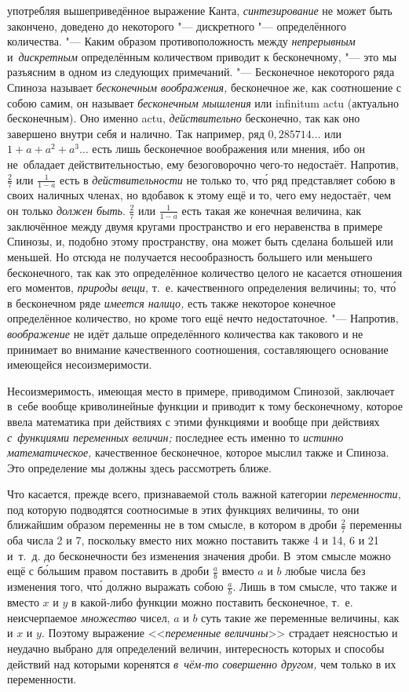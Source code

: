 употребляя вышеприведённое выражение Канта, {\em синтезирование} не может быть
закончено, доведено до некоторого "--- дискретного "--- определённого
количества. "--- Каким образом противоположность между {\em непрерывным}
и~{\em дискретным} определённым количеством приводит к бесконечному, "--- это
мы разъясним в одном из следующих примечаний. "--- Бесконечное некоторого ряда
Спиноза называет {\em бесконечным воображения,} бесконечное же, как соотношение
с собою самим, он называет {\em бесконечным мышления} или infinitum actu
(актуально бесконечным). Оно именно actu, {\em действительно} бесконечно, так
как оно завершено внутри себя и налично. Так например, ряд $0{,}285714\ldots$
или $1+a+a^2+a^3\ldots$ есть лишь бесконечное воображения или мнения, ибо он
не~обладает действительностью, ему безоговорочно чего-то недостаёт. Напротив,
$\frac 2 7$ или $\frac 1{1-a}$ есть в {\em действительности} не только то, чт\'{о} ряд
представляет собою в своих наличных членах, но вдобавок к этому ещё и то, чего
ему недостаёт, чем он только {\em должен быть}. $\frac 2 7$ или $\frac 1{1-a}$
есть такая же конечная величина, как заключённое между двумя кругами
пространство и его неравенства в примере Спинозы, и, подобно этому
пространству, она может быть сделана большей или меньшей. Но отсюда не
получается несообразность большего или меньшего бесконечного, так как это
определённое количество целого не касается отношения его моментов,
{\em природы вещи,} т.~е. качественного определения величины; то, чт\'{о} в бесконечном
ряде {\em имеется налицо,} есть также некоторое конечное определённое количество,
но кроме того ещё нечто недостаточное. "--- Напротив, {\em воображение} не идёт
дальше определённого количества как такового и не принимает во внимание
качественного соотношения, составляющего основание имеющейся несоизмеримости.

Несоизмеримость, имеющая место в примере, приводимом Спинозой, заключает в~себе
вообще криволинейные функции и приводит к тому бесконечному, которое ввела
математика при действиях с этими функциями и вообще при действиях
{\em с~функциями переменных величин;} последнее есть именно то
{\em истинно математическое,} качественное бесконечное, которое мыслил
также и Спиноза. Это определение мы должны здесь рассмотреть ближе.

Что касается, прежде всего, признаваемой столь важной категории
{\em переменности,} под которую подводятся соотносимые в этих функциях
величины, то они ближайшим образом переменны не в том смысле, в котором в дроби
$\frac 2 7$ переменны оба числа 2 и 7, поскольку вместо них можно поставить
также 4 и 14, 6 и 21 и~т.~д. до бесконечности без изменения значения дроби.
В~этом смысле можно ещё с б\'{о}льшим правом поставить в дроби $\frac a b$ вместо
$a$ и $b$ любые числа без изменения того, чт\'{о} должно выражать собою
$\frac a b$. Лишь в том смысле, что также и вместо $x$ и $y$ в какой-либо
функции можно поставить бесконечное, т.~е. неисчерпаемое {\em множество} чисел,
$a$ и $b$ суть такие же переменные величины, как и $x$ и $y$. Поэтому выражение
<<{\em переменные величины}>> страдает неясностью и неудачно выбрано для
определений величин, интересность которых и способы действий над которыми
коренятся {\em в~чём-то совершенно другом,} чем только в их переменности.

